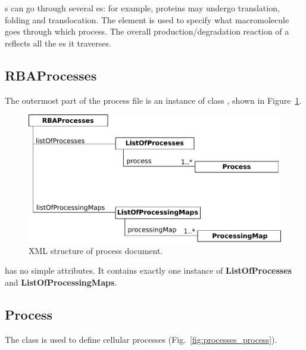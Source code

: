 \macromolecule{}s can go through several \process{}es:
for example, proteins may undergo translation, folding and translocation.
The \processings{} element is used to specify what macromolecule goes
through which process.
The overall production/degradation reaction of a \macromolecule{} reflects
all the \process{}es it traverses.

\subsection{RBAProcesses}
\label{sec:rba_processes}

The outermost part of the process file is an instance of class
\rbaprocesses, shown in Figure~\ref{fig:processes_doc}.

\begin{figure}
  \centering
  \includegraphics[scale=0.8]{figures/processes_doc}
  \caption{XML structure of process document.}
\label{fig:processes_doc}
\end{figure}

\rbaprocesses{} has no simple attributes.
It contains exactly one instance of \textbf{ListOfProcesses}
and \textbf{ListOfProcessingMaps}.


\subsection{Process}
\label{sec:process}

The \process{} class is used to define cellular processes
(Fig.~\ref{fig:processes_process}).

